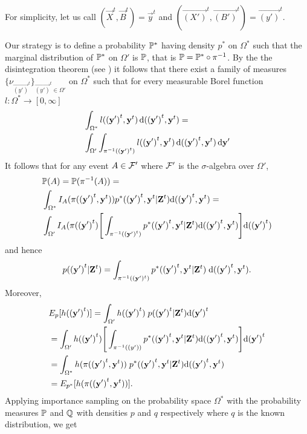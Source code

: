 For simplicity, let us call $(\vec{X}^{t}, \vec{B}^{t}) = \vec{y}^{t}$ and $(\vec{(X')}^{t}, \vec{(B')}^{t}) = \vec{(y')}^{t}$.

Our strategy is to define a probability $\P^*$ having density $p^*$ on $\Omega^*$ such that the marginal distribution of $\P^*$ on $\Omega'$ is $\P$, that is $\P = \P^* \circ \pi^{-1}$. By the the disintegration theorem (see \cite{Rohlin}) it follows that there exist a family of measures $\{ \nu_{\vec{(y')}^t} \}_{\vec{(y')}^t \in \Omega'}$ on $\Omega^*$ such that for every measurable Borel function $l:\Omega^* \rightarrow [0, \infty]$
\begin{align*}
    &\int_{\Omega^*} l(\vec{(y')}^t, \vec{y}^t)\diff (\vec{(y')}^t,\vec{y}^t) = \\
    & \int_{\Omega'}\int_{\pi^{-1}(\vec{(y')}^t)} l(\vec{(y')}^t, \vec{y}^t) \diff (\vec{(y')}^t, \vec{y}^t) \diff \vec{\vec{y'}}
\end{align*}
It follows that for any event $A \in \F'$ where $\F'$ is the $\sigma$-algebra over $\Omega'$,
\begin{align*}
    &\P(A) = \P(\pi^{-1}(A)) = \\
    &\int_{\Omega^*} I_A(\pi(\vec{(y')}^t, \vec{y}^t)) p^*(\vec{(y')}^t, \vec{y}^t | \vec{Z}^t) \D (\vec{(y')}^t, \vec{y}^t) = \\
    & \int_{\Omega'} I_A(\pi(\vec{(y')}^t) \Bigg[ \int_{\pi^{-1}(\vec{(y')}^t)} p^*(\vec{(y')}^t, \vec{y}^t | \vec{Z}^t) \D (\vec{(y')}^t, \vec{y}^t) \Bigg] \D (\vec{(y')}^t)
\end{align*}
and hence
\begin{equation*}
    p(\vec{(y')}^t | \vec{Z}^t) = \int_{\pi^{-1}((\vec{y}')^t)} p^*(\vec{(y')}^t, \vec{y}^t | \vec{Z}^t)\; \D (\vec{(y')}^t, \vec{y}^t).
\end{equation*}
Moreover,
\begin{align*}
    &E_{p}[h(\vec{(y')}^{t})]  = \int_{\Omega'} h(\vec{(y')}^{t})\; p(\vec{(y')}^{t} | \vec{Z}^{t}) \D \vec{(y')}^{t} \\
    &= \int_{\Omega'} h(\vec{(y')}^{t})\Bigg[\int_{\pi^{-1}(\vec(y'))} p^*(\vec{(y')}^{t}, \vec{y}^{t} | \vec{Z}^{t}) \D (\vec{(y')}^t, \vec{y}^t) \Bigg] \D \vec{(y')}^{t} \\ 
    &= \int_{\Omega^*} h(\pi(\vec{(y')}^{t}, \vec{y}^{t}))\; p^*(\vec{(y')}^{t}, \vec{y}^{t} | \vec{Z}^{t}) \D (\vec{(y')}^t, \vec{y}^t) \\ 
    &= E_{p^*}[h(\pi (\vec{(y')}^{t}, \vec{y}^{t}))].
\end{align*}
Applying importance sampling on the probability space $\Omega^*$ with the probability measures $\P$ and $\Q$ with densities $p$ and $q$ respectively where $q$ is the known distribution, we get
